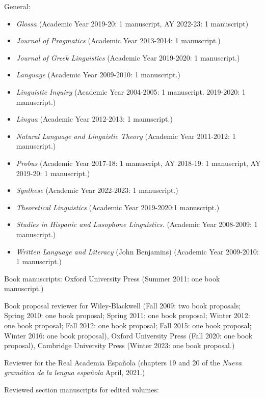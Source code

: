 \documentclass[11pt]{article}
\begin{document}
General:
\begin{itemize}
\item[] \textit{Glossa} (Academic Year 2019-20: 1 manuscript, AY 2022-23: 1 manuscript)
\item[] \textit{Journal of Pragmatics} (Academic Year
  2013-2014: 1
  manuscript.)
  \item[] \textit{Journal of Greek Linguistics} (Academic Year
    2019-2020: 1
    manuscript.)
\item[] \textit{Language} (Academic Year  2009-2010: 1 manuscript.)
\item[] \textit{Linguistic Inquiry} (Academic Year  2004-2005: 1 manuscript. 2019-2020: 1 manuscript.)
\item[] \textit{Lingua} (Academic Year  2012-2013: 1 manuscript.)
\item[] \textit{Natural Language and Linguistic Theory} (Academic Year
  2011-2012: 1
  manuscript.)
  \item[] \textit{Probus} (Academic Year 2017-18: 1 manuscript, AY 2018-19: 1 manuscript, AY 2019-20: 1 manuscript.)
  \item[] \textit{Synthese} (Academic Year 2022-2023: 1 manuscript.)
  \item[] \textit{Theoretical Linguistics} (Academic Year 2019-2020:1 manuscript.)
\item[] \textit{Studies in Hispanic and Lusophone Linguistics.} (Academic Year 
  2008-2009: 1 manuscript.)
\item[] \textit{Written Language and Literacy} (John Benjamins) (Academic Year 
  2009-2010: 1 manuscript.)
\end{itemize}


Book manuscripts: Oxford University Press
(Summer 2011: one book manuscript.)

Book proposal reviewer for Wiley-Blackwell (Fall 2009: two book
proposals; Spring 2010: one book
proposal; Spring 2011: one book proposal; Winter 2012: one book
proposal; Fall 2012: one book proposal; Fall 2015: one book proposal; Winter 2016: one book proposal), Oxford University Press (Fall 2020: one book proposal), Cambridge University Press (Winter 2023: one book proposal.)

Reviewer for the Real Academia Espa\~nola (chapters 19 and 20 of the \textit{Nueva gramática de la lengua española} April, 2021.)

Reviewed section manuscripts for edited volumes: 
\end{document}
